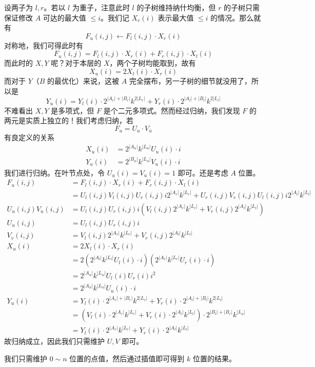 \documentclass[12pt]{ctexart}
\theoremstyle{theorem}
\theoremstyle{theorem}
\begin{document}
设两子为 $l, r$。若以 $l$ 为重子，注意此时 $l$ 的子树维持纳什均衡，但 $r$ 的子树只需保证修改 $A$ 可达的最大值 $\le i$。我们记 $X_r(i)$ 表示最大值 $\le i$ 的情况。那么就有
$$
F_u(i,j) \leftarrow F_l(i,j) \cdot X_r(i)
$$
对称地，我们可得此时有
$$
F_u(i,j) = F_l(i,j) \cdot X_r(i) + F_r(i,j) \cdot X_l(i)
$$
而此时的 $X,Y$ 呢？对于本层的 $X$，两个子树均能取到，故有
$$
X_u(i) = 2X_l(i)\cdot X_r(i)
$$
而对于 $Y$（$B$ 的最优化）来说，这被 $A$ 完全摆布，另一子树的细节就没用了，所以是
$$
Y_u(i) = Y_l(i) \cdot 2^{|A_r|+|B_r|}k^{2|L_r|} + Y_r(i) \cdot 2^{|A_l|+|B_l|}k^{2|L_l|}
$$
不难看出 $X,Y$ 是多项式，但 $F$ 是个二元多项式。然而经过归纳，我们发现 $F$ 的两元是实质上独立的！我们考虑归纳，若
$$
F_u = U_u \cdot V_u
$$
有良定义的关系
$$
\begin{aligned}
X_u(i) &= 2^{|A_u|} k^{|L_u|} U_u(i)\cdot i\\
Y_u(i) &= 2^{|B_u|} k^{|L_u|} V_u(i)\cdot i
\end{aligned}
$$
我们进行归纳。在叶节点处，令 $U_u(i)=V_u(i)=1$ 即可。还是考虑 $A$ 位置。
\begin{align*}
F_u(i,j) &= F_l(i,j) \cdot X_r(i) + F_r(i,j) \cdot X_l(i)\\
&= U_l(i,j)V_l(i,j)U_r(i,j)i 2^{|A_r|} k^{|L_r|} +U_r(i,j)V_r(i,j)U_l(i,j)i 2^{|A_l|} k^{|L_l|}\\
U_u(i,j)V_u(i,j)&= U_l(i,j)U_r(i,j) i\left( V_l(i,j) 2^{|A_r|} k^{|L_r|}+ V_r(i,j) 2^{|A_l|} k^{|L_l|} \right)\\
U_u(i,j)&=U_l(i,j)U_r(i,j) i\\
V_v(i,j)&=V_l(i,j) 2^{|A_r|} k^{|L_r|}+ V_r(i,j) 2^{|A_l|} k^{|L_l|}\\
X_u(i)&=2 X_l(i)\cdot X_r(i)\\
&=2 \left(2^{|A_l|} k^{|L_l|} U_l(i)\cdot i\right) \left(2^{|A_r|} k^{|L_r|} U_r(i)\cdot i\right)\\
&=2^{|A_u|}k^{|L_u|} U_l(i)U_r(i)i^2\\
&=2^{|A_u|}k^{|L_u|} U_u(i)\cdot i\\
Y_u(i)&= Y_l(i) \cdot 2^{|A_r|+|B_r|}k^{2|L_r|} + Y_r(i) \cdot 2^{|A_l|+|B_l|}k^{2|L_l|}\\
&= \left( V_l(i) \cdot 2^{|A_r|}k^{|L_r|} + V_r(i) \cdot 2^{|A_l|}k^{|L_l|} \right)\cdot 2^{|B_l|+|B_r|} k^{|L_u|}\\
&= Y_l(i) \cdot 2^{|A_r|}k^{|L_r|} + Y_r(i) \cdot 2^{|A_l|}k^{|L_l|} 
\end{align*}
故归纳成立，因此我们只需维护 $U,V$ 即可。

我们只需维护 $0\sim n$ 位置的点值，然后通过插值即可得到 $k$ 位置的结果。
\end{document}
